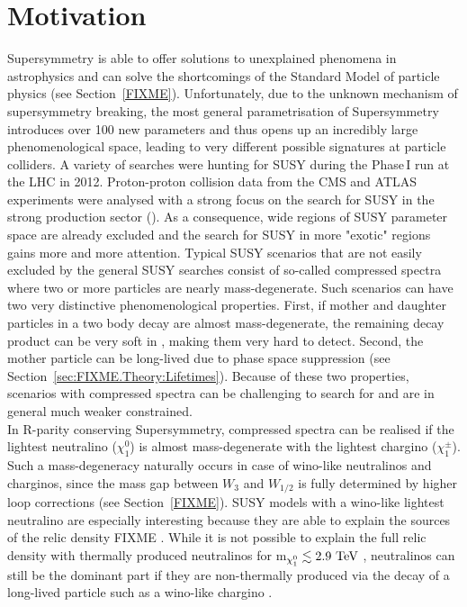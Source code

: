 \chapter{Motivation}
\label{sec:Motivation}
Supersymmetry is able to offer solutions to unexplained phenomena in astrophysics and can solve the shortcomings of the Standard Model of particle physics (see Section~\ref{FIXME}).
Unfortunately, due to the unknown mechanism of supersymmetry breaking, the most general parametrisation of Supersymmetry introduces over 100 new parameters and thus opens up an incredibly large phenomenological space, 
leading to very different possible signatures at particle colliders. 
A variety of searches were hunting for SUSY during the Phase\,I run at the LHC in 2012.
Proton-proton collision data from the CMS and ATLAS experiments were analysed with a strong focus on the search for SUSY in the strong production sector (\eg \cite{bib:CMS:RA2_8TeV,bib:CMS:MT2_8TeV,bib:ATLAS:JetPlusMET_8TeV}).
As a consequence, wide regions of SUSY parameter space are already excluded and 
the search for SUSY in more "exotic" regions gains more and more attention. 
Typical SUSY scenarios that are not easily excluded by the general SUSY searches consist of so-called compressed spectra where two or more particles are nearly mass-degenerate.
Such scenarios can have two very distinctive phenomenological properties.
First, if mother and daughter particles in a two body decay are almost mass-degenerate, the remaining decay product can be very soft in \pt, making them very hard to detect.
Second, the mother particle can be long-lived due to phase space suppression (see Section~\ref{sec:FIXME.Theory:Lifetimes}).
Because of these two properties, scenarios with compressed spectra can be challenging to search for and are in general much weaker constrained.\\

In R-parity conserving Supersymmetry, compressed spectra can be realised if the lightest neutralino ($\chi^{0}_1$) is almost mass-degenerate with the lightest chargino ($\chi^{\pm}_1$).
Such a mass-degeneracy naturally occurs in case of wino-like neutralinos and charginos, since the mass gap between $W_{3}$ and $W_{1/2}$ is fully determined by higher loop corrections (see Section~\ref{FIXME}).
SUSY models with a wino-like lightest neutralino are especially interesting because they are able to explain the sources of the relic density FIXME \cite{}. 
While it is not possible to explain the full relic density with thermally produced neutralinos for m$_{\chi^{0}_1}\lesssim 2.9\,\,\text{Te}\kern-0.06667em\text{V}$ \cite{bib:Ibe:DarkMatter_2015}, neutralinos can still be the dominant part if they are non-thermally produced via the decay of a long-lived particle such as a wino-like chargino \cite{bib:Moroi:DarkMatter_2013}.\\


